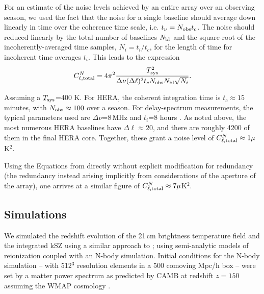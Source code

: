 For an estimate of the noise levels achieved by an entire array over an observing season, we used the fact that the noise for a single baseline should average down linearly in time over the coherence time scale, i.e. $t_{\nu} = N_{\rm obs}t_c$. The noise should reduced linearly by the total number of baselines $N_{\rm bl}$ and the square-root of the incoherently-averaged time samples, $N_i = t_i/t_c$, for the length of time for incoherent time averages $t_i$. This leads to the expression
\begin{equation}
C^N_{\ell,{\rm total}} = 4\pi^2\frac{T_{\rm sys}^2}{\Delta\nu(\Delta\ell)^2 t_c N_{\rm obs} N_{\rm bl}\sqrt{N_i}}.
\label{eq:ksz_21cm_HERA_noise_total}
\end{equation}

Assuming a $T_{\rm sys}$=400 K. For HERA, the coherent integration time is $t_c\approx 15$\,minutes, with $N_{\rm obs}\approx100$ over a season. For delay-spectrum measurements, the typical parameters used are $\Delta\nu$=8\,MHz and $t_i$=8 hours \citep{Ali.15}. As noted above, the most numerous HERA baselines have $\Delta\ell\approx 20$, and there are roughly 4200 of them in the final HERA core. Together, these grant a noise level of $C^N_{\ell,{\rm total}}\approx 1 \mu$K$^2$.

Using the Equations from \cite{Zaldarriaga.04} directly without explicit modification for redundancy (the redundancy instead arising implicitly from considerations of the aperture of the array), one arrives at a similar figure of $C^N_{\ell,{\rm total}}\approx 7 \mu$K$^2$.

\subsection{Simulations}

We simulated the redshift evolution of the 21\,cm brightness temperature field and the integrated kSZ using a similar approach to \cite{LaPlante.14}; using semi-analytic models of reionization coupled with an N-body simulation. Initial conditions for the N-body simulation -- with 512$^3$ resolution elements in a 500 comoving Mpc/h box -- were set by a matter power spectrum as predicted by CAMB \citep{Lewis.99} at redshift $z=150$ assuming the WMAP cosmology \citep{Hinshaw.13}.

